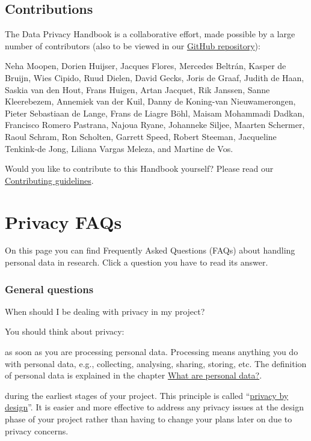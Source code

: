 \documentclass[
]{book}
\begin{document}
\hypertarget{contributions}{%
\section{Contributions}\label{contributions}}

The Data Privacy Handbook is a collaborative effort, made possible by a large
number of contributors (also to be viewed in our
\href{https://github.com/UtrechtUniversity/dataprivacyhandbook}{GitHub repository}):

Neha Moopen, Dorien Huijser, Jacques Flores, Mercedes Beltrán, Kasper de Bruijn,
Wies Cipido, Ruud Dielen, David Gecks, Joris de Graaf, Judith de Haan,
Saskia van den Hout, Frans Huigen, Artan Jacquet, Rik Janssen, Sanne Kleerebezem,
Annemiek van der Kuil, Danny de Koning-van Nieuwamerongen,
Pieter Sebastiaan de Lange, Frans de Liagre Böhl, Maisam Mohammadi Dadkan,
Francisco Romero Pastrana, Najoua Ryane, Johanneke Siljee, Maarten Schermer, Raoul Schram,
Ron Scholten, Garrett Speed, Robert Steeman, Jacqueline Tenkink-de Jong,
Liliana Vargas Meleza, and Martine de Vos.

Would you like to contribute to this Handbook yourself? Please read our
\href{https://github.com/UtrechtUniversity/dataprivacyhandbook/blob/main/CONTRIBUTING.md}{Contributing guidelines}.

\hypertarget{faq}{%
\chapter{Privacy FAQs}\label{faq}}

On this page you can find Frequently Asked Questions (FAQs) about handling
personal data in research. Click a question you have to read its answer.

\hypertarget{general}{%
\subsection{General questions}\label{general}}

When should I be dealing with privacy in my project?

You should think about privacy:

as soon as you are processing personal data. Processing means anything you do with personal data, e.g., collecting, analysing, sharing, storing, etc. The definition of personal data is explained in the chapter \protect\hyperlink{personal-data}{What are personal data?}.

during the earliest stages of your project. This principle is called ``\protect\hyperlink{privacy-by-design}{privacy by design}''. It is easier and more effective to address any privacy issues at the design phase of your project rather than having to change your plans later on due to privacy concerns.
\end{document}
